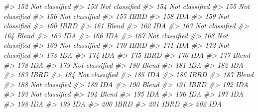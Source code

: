 \documentclass[
  xelatex, ja=standard]{bxjsbook}
\newenvironment{Shaded}{\begin{snugshade}}{\end{snugshade}}
\newcommand{\CommentTok}[1]{\textcolor[rgb]{0.56,0.35,0.01}{\textit{#1}}}
\theoremstyle{definition}
\theoremstyle{definition}
\theoremstyle{definition}
\theoremstyle{definition}
\theoremstyle{remark}
\begin{document}
\begin{Shaded}
\begin{Highlighting}[]
\CommentTok{\#\textgreater{} 152 Not classified}
\CommentTok{\#\textgreater{} 153 Not classified}
\CommentTok{\#\textgreater{} 154 Not classified}
\CommentTok{\#\textgreater{} 155 Not classified}
\CommentTok{\#\textgreater{} 156 Not classified}
\CommentTok{\#\textgreater{} 157           IBRD}
\CommentTok{\#\textgreater{} 158            IDA}
\CommentTok{\#\textgreater{} 159 Not classified}
\CommentTok{\#\textgreater{} 160           IBRD}
\CommentTok{\#\textgreater{} 161          Blend}
\CommentTok{\#\textgreater{} 162            IDA}
\CommentTok{\#\textgreater{} 163 Not classified}
\CommentTok{\#\textgreater{} 164          Blend}
\CommentTok{\#\textgreater{} 165            IDA}
\CommentTok{\#\textgreater{} 166            IDA}
\CommentTok{\#\textgreater{} 167 Not classified}
\CommentTok{\#\textgreater{} 168 Not classified}
\CommentTok{\#\textgreater{} 169 Not classified}
\CommentTok{\#\textgreater{} 170           IBRD}
\CommentTok{\#\textgreater{} 171            IDA}
\CommentTok{\#\textgreater{} 172 Not classified}
\CommentTok{\#\textgreater{} 173            IDA}
\CommentTok{\#\textgreater{} 174            IDA}
\CommentTok{\#\textgreater{} 175           IBRD}
\CommentTok{\#\textgreater{} 176            IDA}
\CommentTok{\#\textgreater{} 177          Blend}
\CommentTok{\#\textgreater{} 178            IDA}
\CommentTok{\#\textgreater{} 179 Not classified}
\CommentTok{\#\textgreater{} 180          Blend}
\CommentTok{\#\textgreater{} 181            IDA}
\CommentTok{\#\textgreater{} 182            IDA}
\CommentTok{\#\textgreater{} 183           IBRD}
\CommentTok{\#\textgreater{} 184 Not classified}
\CommentTok{\#\textgreater{} 185            IDA}
\CommentTok{\#\textgreater{} 186           IBRD}
\CommentTok{\#\textgreater{} 187          Blend}
\CommentTok{\#\textgreater{} 188 Not classified}
\CommentTok{\#\textgreater{} 189            IDA}
\CommentTok{\#\textgreater{} 190          Blend}
\CommentTok{\#\textgreater{} 191           IBRD}
\CommentTok{\#\textgreater{} 192            IDA}
\CommentTok{\#\textgreater{} 193 Not classified}
\CommentTok{\#\textgreater{} 194          Blend}
\CommentTok{\#\textgreater{} 195            IDA}
\CommentTok{\#\textgreater{} 196            IDA}
\CommentTok{\#\textgreater{} 197            IDA}
\CommentTok{\#\textgreater{} 198            IDA}
\CommentTok{\#\textgreater{} 199            IDA}
\CommentTok{\#\textgreater{} 200           IBRD}
\CommentTok{\#\textgreater{} 201           IBRD}
\CommentTok{\#\textgreater{} 202            IDA}
\end{Highlighting}
\end{Shaded}
\end{document}
